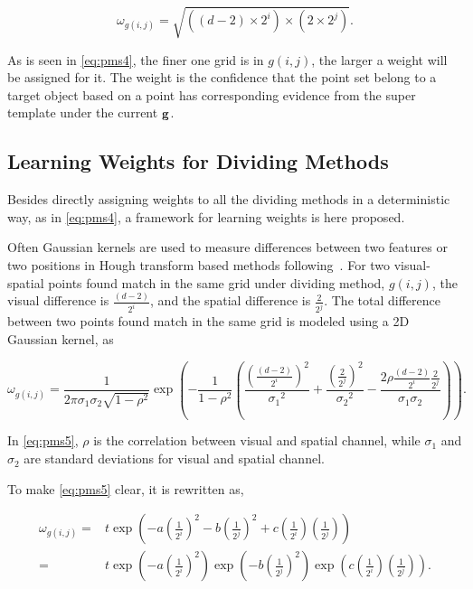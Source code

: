 \begin{equation}
\label{eq:pms4}
\omega_{g(i,j)}=\sqrt{ ((d-2)\times{2^i})\times(2 \times {2^j})  }.
\end{equation}

As is seen in \ref{eq:pms4}, the finer one grid is in $g(i,j)$, the larger a weight will be assigned for it. The weight is the confidence that the point set belong to a target object based on a point has corresponding evidence from the super template under the current $\bf g$.

\subsection{Learning Weights for Dividing Methods}
Besides directly assigning weights to all the dividing methods in a deterministic way, as in \ref{eq:pms4}, a framework for learning weights is here proposed.

Often Gaussian kernels are used to measure differences between two features or two positions in Hough transform based methods following~\citep{lb1}.
For two visual-spatial points found match in the same grid under dividing method, $g(i,j)$,
the visual difference  is  $ \frac {(d-2)}{2^i}$, and the spatial difference is  $ \frac 2 {2^j}$.
The total difference between two points found match in the same grid is modeled using a 2D Gaussian kernel, as

\begin{equation}
\label{eq:pms5}
\omega_{g(i,j)}=\frac 1 {2 \pi \sigma_1 \sigma_2 \sqrt{1-\rho^2} }\exp(- \frac 1 {1-\rho^2} ( \frac {(\frac {(d-2)}{2^i})^2} {{\sigma_1}^2}
+ \frac {(\frac {2}{2^j})^2} {{\sigma_2}^2}  - \frac {2 \rho \frac {(d-2)}{2^i}  \frac 2 {2^j}}{\sigma_1 \sigma_2} )).
\end{equation}


In \ref{eq:pms5}, $\rho$ is the correlation between visual and spatial channel, while $\sigma_1$ and $\sigma_2$ are standard deviations for visual and spatial channel.

To make \ref{eq:pms5} clear, it is rewritten as,

\begin{equation}
\label{eq:pms6}
\begin{aligned}
\omega_{g(i,j)}=& t \exp(-a (\frac 1 {2^i})^2 - b (\frac 1 {2^j})^2 + c (\frac 1 {2^i}) (\frac 1 {2^j}))\\
                =& t \exp(-a (\frac 1 {2^i})^2) \exp(- b (\frac 1 {2^j})^2 )\exp ( c (\frac 1 {2^i}) (\frac 1 {2^j})).
\end{aligned}
\end{equation}

